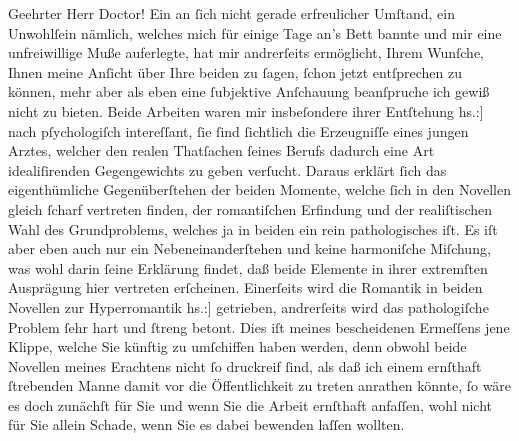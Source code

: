 \pstart\center{}Geehrter Herr Doctor!\pend\vspace{0.5em}
\pstart
           Ein an ſich nicht gerade erfreulicher Umſtand, ein Unwohlſein nämlich, welches mich
               für einige Tage an’s Bett bannte und mir eine unfreiwillige Muße auferlegte, hat mir
               andrerſeits ermöglicht, Ihrem Wunſche, Ihnen meine Anſicht über Ihre beiden \label{K_L03619-1v}\label{K_L03619-1} zu ſagen, ſchon jetzt entſprechen zu können, mehr aber als eben eine
               ſubjektive Anſchauung beanſpruche ich gewiß nicht zu bieten. Beide Arbeiten waren mir
               insbeſondere ihrer Entſtehung \introOben{}{[}hs.:{]} nach\introOben{} pſychologiſch intereſſant, ſie ſind
               ſichtlich die Erzeugniſſe eines jungen Arztes, welcher den realen Thatſachen ſeines
               Berufs dadurch eine Art idealiſirenden Gegengewichts zu geben verſucht. {\pb}Daraus erklärt ſich das eigenthümliche
               Gegenüberſtehen der beiden Momente, welche ſich in den Novellen gleich ſcharf
               vertreten finden, der romantiſchen Erfindung und der realiſtischen Wahl des
               Grundproblems, welches ja in beiden ein rein pathologisches iſt. Es iſt aber eben
               auch nur ein Nebeneinanderſtehen und keine harmoniſche Miſchung, was wohl darin ſeine
               Erklärung findet, daß beide Elemente in ihrer extremſten Ausprägung hier vertreten
               erſcheinen. Einerſeits wird die Romantik in beiden Novellen zur
               Hyperromantik \introOben{}{[}hs.:{]} getrieben\introOben{}, andrerſeits wird das pathologiſche
               Problem ſehr hart und ſtreng betont. Dies iſt meines bescheidenen Ermeſſens jene
               Klippe, welche Sie künftig zu umſchiffen haben werden, denn obwohl beide Novellen
               meines Erachtens nicht ſo druckreif ſind, als daß ich einem ernſthaft ſtrebenden
               Manne damit vor die Öffentlichkeit zu treten anrathen könnte, ſo wäre es doch
               zunächſt für Sie und {\pb}wenn Sie die Arbeit ernſthaft
               anfaſſen, wohl nicht für Sie allein Schade, wenn Sie es dabei bewenden laſſen
               wollten.\pend
           
